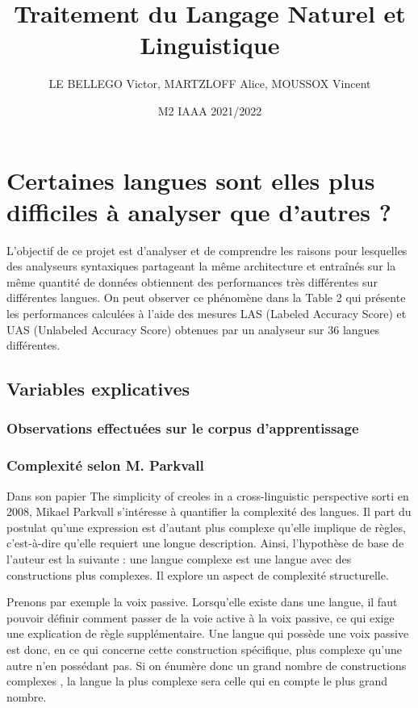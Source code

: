 \documentclass[a4paper, twoside]{article}
\title{Traitement du Langage Naturel et Linguistique}
\date{M2 IAAA 2021/2022}
\author{LE BELLEGO Victor, MARTZLOFF Alice, MOUSSOX Vincent}
\makeatletter
\newcommand{\inputmintedcustom}[1]{\begingroup \catcode`_=12 \texttt{#1} \begin{mdframed}[topline = false, leftline = true, rightline = false, bottomline = false,backgroundcolor=bgLightGray,linewidth=0.5pt]
\inputminted[linenos=true, tabsize=4, fontsize=\small, xleftmargin=0pt, xrightmargin=5pt, breaklines=true, obeytabs=true, numbersep=5mm,]{python}{#1}
\end{mdframed}}
\newenvironment{beware}[1][\@nil]
{	\def\tmp{#1}%
    \setlength{\OuterFrameSep}{0pt}						%
	\setlength{\FrameSep}{1mm}							%
	\definecolor{shadecolor}{rgb}{1.00,0.80,0.80}		%
	\begin{leftbar}\noindent{}%
	\ifx\tmp\@nnil{}\else{\textbf{#1 : }}\fi}           %
{\end{leftbar}\par}
\makeatother
\begin{document}
\maketitle

    \section{Certaines langues sont elles plus difficiles à analyser que d’autres ?}
L'objectif de ce projet est d'analyser et de comprendre les raisons pour lesquelles des analyseurs syntaxiques partageant la même architecture et entraînés sur la même quantité de données obtiennent des performances très différentes sur différentes langues. On peut observer ce phénomène dans la Table 2 qui présente les performances calculées à l'aide des mesures LAS (Labeled Accuracy Score) et UAS (Unlabeled Accuracy Score) obtenues par un analyseur sur 36 langues différentes.


    \subsection{Variables explicatives}

    \subsubsection{Observations effectuées sur le corpus d'apprentissage}
    \subsubsection{Complexité selon M. Parkvall}

    Dans son papier The simplicity of creoles in a cross-linguistic perspective sorti en 2008, Mikael Parkvall s’intéresse à quantifier la complexité des langues. Il part du postulat qu’une expression est d’autant plus complexe qu’elle implique de règles, c’est-à-dire qu’elle requiert une longue description. Ainsi, l'hypothèse de base de l’auteur est la suivante : une langue complexe est une langue avec des constructions plus complexes. Il explore un aspect de complexité structurelle.

    Prenons par exemple la voix passive. Lorsqu’elle existe dans une langue, il faut pouvoir définir comment passer de la voie active à la voix passive, ce qui exige une explication de règle supplémentaire. Une langue qui possède une voix passive est donc, en ce qui concerne cette construction spécifique, plus complexe qu’une autre n’en possédant pas. Si on énumère donc un grand nombre de \og constructions complexes \fg{}, la langue la plus complexe sera celle qui en compte le plus grand nombre.
\end{document}
